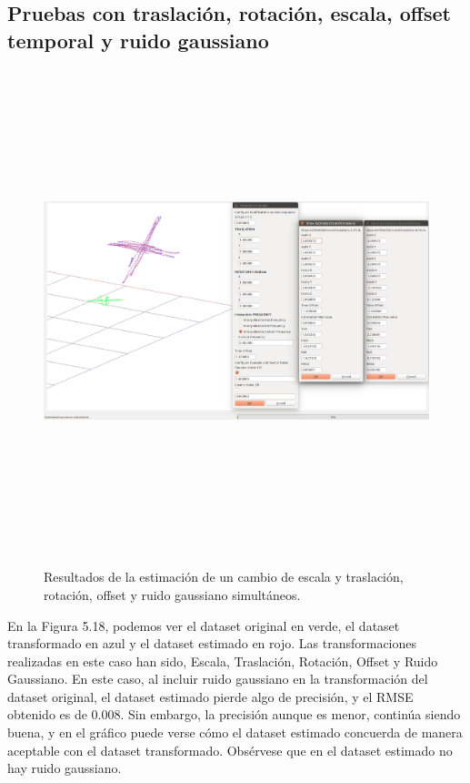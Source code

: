 \subsection{Pruebas con traslación, rotación, escala, offset temporal y ruido gaussiano}
\begin{figure}[H]
\begin{center}
\label{fig:opciones de View}\includegraphics[height=14.0cm,width=18.0cm]{img/cap6/Escala_Trasla_Rota_Offset_GaussNoise_abba.png}
\hspace{0.5cm}

\end{center}

\caption{Resultados de la estimación de un cambio de escala y traslación, rotación, offset y ruido gaussiano simultáneos.}
\end{figure}
En la Figura 5.18, podemos ver el dataset original en verde, el dataset transformado en azul y el dataset estimado en rojo.
Las transformaciones realizadas en este caso han sido, Escala, Traslación, Rotación, Offset y Ruido Gaussiano.
En este caso, al incluir ruido gaussiano en la transformación del dataset original, el dataset estimado pierde algo de precisión, y el RMSE obtenido es de  0.008.
Sin embargo, la precisión aunque es menor, continúa siendo buena, y en el gráfico puede verse cómo el dataset estimado concuerda de manera aceptable con el dataset transformado. Obsérvese que en el dataset estimado no hay ruido gaussiano.
